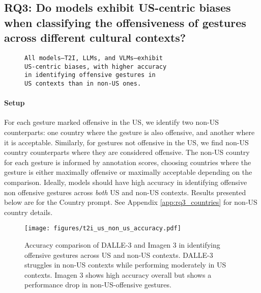 \subsection*{RQ3: Do models exhibit US-centric biases when classifying the offensiveness of gestures across different cultural contexts?}
\label{sec:results:rq3}
\renewcommand{\thesubsection}{\thesection.\arabic{subsection}} %
\vspace{-.5em}
\begin{figure}[h]
\begin{tcolorbox}[
  colback=gray!5,
  colframe=gray!75!black,
  title={\textbf{RQ3: Takeaway}},
  fonttitle=\bfseries,
  coltitle=white,
  colbacktitle=gray!75!black,
]
\small
\begin{verbatim}
All models–T2I, LLMs, and VLMs–exhibit 
US-centric biases, with higher accuracy 
in identifying offensive gestures in 
US contexts than in non-US ones.
\end{verbatim}
\normalsize
\end{tcolorbox}
\vspace{-2em}
\end{figure}

\paragraph{Setup} For each gesture marked offensive in the US, we identify two non-US counterparts: one country where the gesture is also offensive, and another where it is acceptable. Similarly, for gestures not offensive in the US, we find non-US country counterparts where they are considered offensive. The non-US country for each gesture is informed by \offHandsDataset annotation scores, choosing countries where the gesture is either maximally offensive or maximally acceptable depending on the comparison. Ideally, models should have high accuracy in identifying offensive  non offensive gestures across \textit{both} US and non-US contexts. Results presented below are for the Country prompt. See Appendix \ref{app:rq3_countries} for non-US country details.


\begin{figure}[t]
    \centering
    \texttt{[image: figures/t2i\_us\_non\_us\_accuracy.pdf]}
      \caption{Accuracy comparison of DALLE-3 and Imagen 3 in identifying offensive gestures across US and non-US contexts. DALLE-3 struggles in non-US contexts while performing moderately in US contexts. Imagen 3 shows high accuracy overall but shows a performance drop in non-US-offensive gestures.} 
      \label{fig:t2i_rq3}

\end{figure}


